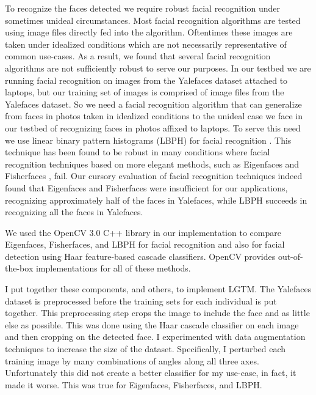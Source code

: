 \documentclass[12pt]{report}
\begin{document}
To recognize the faces detected we require robust facial recognition under sometimes unideal circumstances. Most facial recognition algorithms are tested using image files directly fed into the algorithm. Oftentimes these images are taken under idealized conditions which are not necessarily representative of common use-cases. As a result, we found that several facial recognition algorithms are not sufficiently robust to serve our purposes. In our testbed we are running facial recognition on images from the Yalefaces dataset attached to laptops, but our training set of images is comprised of image files from the Yalefaces \cite{FisherfacesBelhumeur1997} dataset. So we need a facial recognition algorithm that can generalize from faces in photos taken in idealized conditions to the unideal case we face in our testbed of recognizing faces in photos affixed to laptops. To serve this need we use linear binary pattern histograms (LBPH) for facial recognition \cite{LBPHAhonen2004,LearningMultiScalBlockLBPHLiao2007}. This technique has been found to be robust in many conditions where facial recognition techniques based on more elegant methods, such as Eigenfaces \cite{EigenfacesTurk1991} and Fisherfaces \cite{FisherfacesBelhumeur1997}, fail. Our cursory evaluation of facial recognition techniques indeed found that Eigenfaces and Fisherfaces were insufficient for our applications, recognizing approximately half of the faces in Yalefaces, while LBPH succeeds in recognizing all the faces in Yalefaces. \par

We used the OpenCV 3.0 \cite{OpenCV} C++ library in our implementation to compare Eigenfaces, Fisherfaces, and LBPH for facial recognition and also for facial detection using Haar feature-based cascade classifiers. OpenCV provides out-of-the-box implementations for all of these methods. \par

I put together these components, and others, to implement LGTM. The Yalefaces dataset is preprocessed before the training sets for each individual is put together. This preprocessing step crops the image to include the face and as little else as possible. This was done using the Haar cascade classifier on each image and then cropping on the detected face. I experimented with data augmentation techniques to increase the size of the dataset. Specifically, I perturbed each training image by many combinations of angles along all three axes. Unfortunately this did not create a better classifier for my use-case, in fact, it made it worse. This was true for Eigenfaces, Fisherfaces, and LBPH. \par
\end{document}
